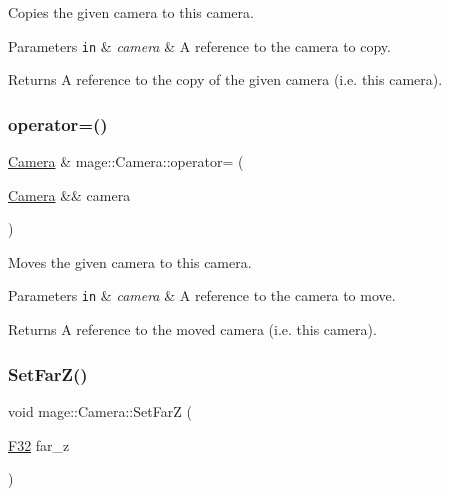 Copies the given camera to this camera.


\begin{DoxyParams}[1]{Parameters}
\mbox{\tt in}  & {\em camera} & A reference to the camera to copy. \\
\hline
\end{DoxyParams}
\begin{DoxyReturn}{Returns}
A reference to the copy of the given camera (i.\+e. this camera). 
\end{DoxyReturn}
\hypertarget{classmage_1_1_camera_a83e33f57394e85eee58745eb8e05b282}{}\label{classmage_1_1_camera_a83e33f57394e85eee58745eb8e05b282} 
\subsubsection{\texorpdfstring{operator=()}{operator=()}\hspace{0.1cm}{\footnotesize\ttfamily [2/2]}}
{\footnotesize\ttfamily \hyperlink{classmage_1_1_camera}{Camera} \& mage\+::\+Camera\+::operator= (\begin{DoxyParamCaption}\item[{\hyperlink{classmage_1_1_camera}{Camera} \&\&}]{camera }\end{DoxyParamCaption})\hspace{0.3cm}{\ttfamily [default]}}

Moves the given camera to this camera.


\begin{DoxyParams}[1]{Parameters}
\mbox{\tt in}  & {\em camera} & A reference to the camera to move. \\
\hline
\end{DoxyParams}
\begin{DoxyReturn}{Returns}
A reference to the moved camera (i.\+e. this camera). 
\end{DoxyReturn}
\hypertarget{classmage_1_1_camera_aa49995ef824eeb807656921406d248a5}{}\label{classmage_1_1_camera_aa49995ef824eeb807656921406d248a5} 
\subsubsection{\texorpdfstring{Set\+Far\+Z()}{SetFarZ()}}
{\footnotesize\ttfamily void mage\+::\+Camera\+::\+Set\+FarZ (\begin{DoxyParamCaption}\item[{\hyperlink{namespacemage_aa97e833b45f06d60a0a9c4fc22ae02c0}{F32}}]{far\+\_\+z }\end{DoxyParamCaption})\hspace{0.3cm}{\ttfamily [noexcept]}}

